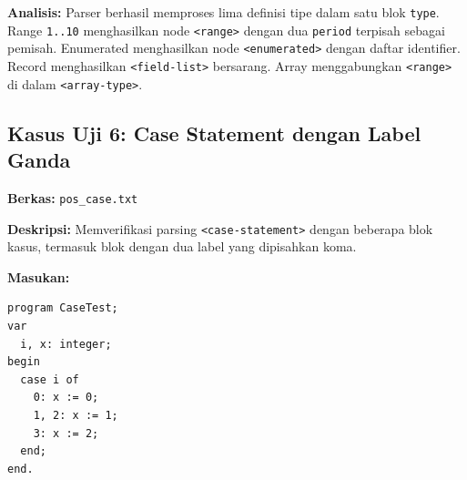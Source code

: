 \documentclass[12pt,a4paper]{article}
\begin{document}
\textbf{Analisis:} Parser berhasil memproses lima definisi tipe dalam satu blok \texttt{type}. Range \texttt{1..10} menghasilkan node \texttt{<range>} dengan dua \texttt{period} terpisah sebagai pemisah. Enumerated menghasilkan node \texttt{<enumerated>} dengan daftar identifier. Record menghasilkan \texttt{<field-list>} bersarang. Array menggabungkan \texttt{<range>} di dalam \texttt{<array-type>}.

\subsection{Kasus Uji 6: Case Statement dengan Label Ganda}
\textbf{Berkas:} \texttt{pos\_case.txt}

\textbf{Deskripsi:} Memverifikasi parsing \texttt{<case-statement>} dengan beberapa blok kasus, termasuk blok dengan dua label yang dipisahkan koma.

\textbf{Masukan:}
\begin{lstlisting}[style=default]
program CaseTest;
var
  i, x: integer;
begin
  case i of
    0: x := 0;
    1, 2: x := 1;
    3: x := 2;
  end;
end.
\end{lstlisting}
\end{document}
